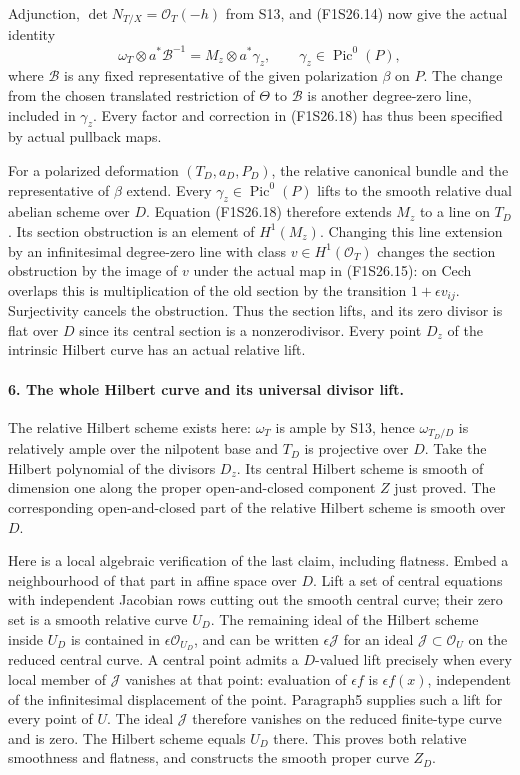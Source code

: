 Adjunction, $\det N_{T/X}=\mathcal O_T(-h)$ from S13,
and (F1S26.14) now give the actual identity
\[
 \omega_T\otimes a^*\mathcal B^{-1}
                         =M_z\otimes a^*\gamma_z,
            \qquad \gamma_z\in\operatorname{Pic}^0(P),
 \tag{F1S26.18}
\]
where $\mathcal B$ is any fixed representative of the
given polarization $\beta$ on $P$. The change from the
chosen translated restriction of $\Theta$ to $\mathcal B$
is another degree-zero line, included in $\gamma_z$.
Every factor and correction in (F1S26.18) has thus been
specified by actual pullback maps.

For a polarized deformation $(T_D,a_D,P_D)$, the relative
canonical bundle and the representative of $\beta$ extend.
Every $\gamma_z\in\operatorname{Pic}^0(P)$ lifts to the
smooth relative dual abelian scheme over $D$.
Equation (F1S26.18) therefore extends $M_z$ to a line on
$T_D$. Its section obstruction is an element of $H^1(M_z)$.
Changing this line extension by an infinitesimal degree-zero
line with class $v\in H^1(\mathcal O_T)$ changes the
section obstruction by the image of $v$ under the actual
map in (F1S26.15): on Cech overlaps this is multiplication
of the old section by the transition $1+\epsilon v_{ij}$.
Surjectivity cancels the obstruction. Thus the section
lifts, and its zero divisor is flat over $D$ since its
central section is a nonzerodivisor. Every point $D_z$ of
the intrinsic Hilbert curve has an actual relative lift.

\paragraph{6. The whole Hilbert curve and its universal divisor lift.}
The relative Hilbert scheme exists here: $\omega_T$ is
ample by S13, hence $\omega_{T_D/D}$ is relatively ample
over the nilpotent base and $T_D$ is projective over $D$.
Take the Hilbert polynomial of the divisors $D_z$.
Its central Hilbert scheme is smooth of dimension one
along the proper open-and-closed component $Z$ just
proved. The corresponding open-and-closed part of the
relative Hilbert scheme is smooth over $D$.

Here is a local algebraic verification of the last claim,
including flatness. Embed a neighbourhood of that part
in affine space over $D$. Lift a set of central equations
with independent Jacobian rows cutting out the smooth
central curve; their zero set is a smooth relative curve
$U_D$. The remaining ideal of the Hilbert scheme inside
$U_D$ is contained in $\epsilon\mathcal O_{U_D}$, and
can be written $\epsilon\mathcal J$ for an ideal
$\mathcal J\subset\mathcal O_U$ on the reduced central
curve. A central point admits a $D$-valued lift precisely
when every local member of $\mathcal J$ vanishes at that
point: evaluation of $\epsilon f$ is $\epsilon f(x)$,
independent of the infinitesimal displacement of the point.
Paragraph5 supplies such a lift for every point of $U$.
The ideal $\mathcal J$ therefore vanishes on the reduced
finite-type curve and is zero. The Hilbert scheme equals
$U_D$ there. This proves both relative smoothness and
flatness, and constructs the smooth proper curve $Z_D$.

